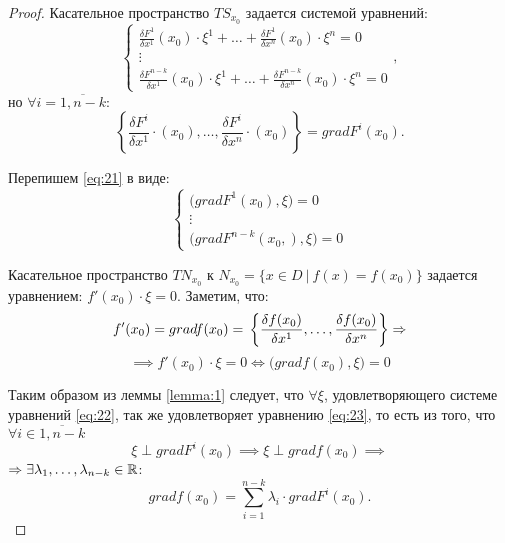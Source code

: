 \begin{proof}
    Касательное пространство $TS_{x_0}$ задается системой уравнений:
    \begin{equation}\label{eq:21}
        \left\{\begin{array}{l}
            \frac{\delta F^1}{\delta x^1}(x_0)\cdot \xi^1 + \ldots + \frac{\delta F^1}{\delta x^n}(x_0) \cdot \xi^n = 0 \\
            \vdots                                                                                                      \\
            \frac{\delta F^{n-k}}{\delta x^1}(x_0)\cdot \xi^1 + \ldots + \frac{\delta F^{n-k}}{\delta x^n}(x_0) \cdot \xi^n = 0
        \end{array}\right.,
    \end{equation}
    но $\forall i = \overline{1,n-k}:$
    \[
        \left\{\frac{\delta F^i}{\delta x^1}\cdot (x_0),\ldots,\frac{\delta F^i}{\delta x^n}\cdot (x_0)\right\} = grad F^i(x_0).
    \]

    Перепишем \ref{eq:21} в виде:
    \begin{equation}\label{eq:22}
        \left\{\begin{array}{l}
            \big(grad F^1(x_0),\xi\big) = 0 \\
            \vdots                          \\
            \big(grad F^{n-k}(x_0,),\xi\big) = 0
        \end{array}\right.
    \end{equation}

    Касательное пространство $TN_{x_0}$ к $N_{x_0} = \big\{x \in D \ \big| \ f(x) = f(x_0)\big\}$ задается уравнением: $f'(x_0)\cdot\xi = 0$. Заметим, что:
    \[
        f'(x_0) = grad f(x_0) = \\ \left\{\frac{\delta f(x_0)}{\delta x^1},\ldots,\frac{\delta f(x_0)}{\delta x^n}\right\} \implies
    \]
    \begin{equation}\label{eq:23}
        \implies f'(x_0)\cdot \xi = 0 \iff \big(grad f(x_0),\xi\big) = 0
    \end{equation}

    Таким образом из леммы \ref{lemma:1} следует, что $\forall \xi$, удовлетворяющего системе уравнений \ref{eq:22}, так же удовлетворяет уравнению \ref{eq:23}, то есть из того, что $\forall i \in \overline{1,n-k}$
    \[
        \xi \perp grad F^i(x_0) \implies \xi \perp grad f(x_0) \implies
    \]
    $ \implies \exists \lambda_1,\ldots,\lambda_{n-k} \in \R $:
    \[
        grad f(x_0) = \sum_{i = 1}^{n-k} \lambda_i\cdot grad F^i(x_0).
    \]
\end{proof}

